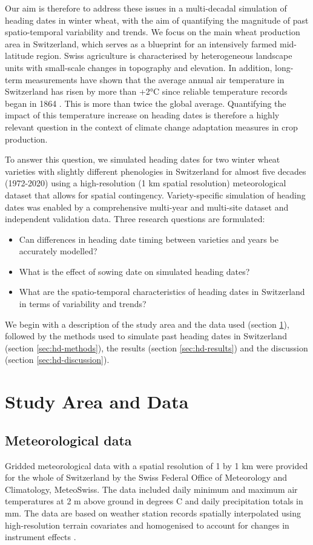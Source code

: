 Our aim is therefore to address these issues in a multi-decadal simulation of heading dates in winter wheat, with the aim of quantifying the magnitude of past spatio-temporal variability and trends. We focus on the main wheat production area in Switzerland, which serves as a blueprint for an intensively farmed mid-latitude region. Swiss agriculture is characterised by heterogeneous landscape units with small-scale changes in topography and elevation. In addition, long-term measurements have shown that the average annual air temperature in Switzerland has risen by more than +2°C since reliable temperature records began in 1864 \citep{isotta_longterm_2019}. This is more than twice the global average. Quantifying the impact of this temperature increase on heading dates is therefore a highly relevant question in the context of climate change adaptation measures in crop production.

To answer this question, we simulated heading dates for two winter wheat varieties with slightly different phenologies in Switzerland for almost five decades (1972-2020) using a high-resolution (1 km spatial resolution) meteorological dataset that allows for spatial contingency. Variety-specific simulation of heading dates was enabled by a comprehensive multi-year and multi-site dataset and independent validation data. Three research questions are formulated:
\begin{itemize}
    \item Can differences in heading date timing between varieties and years be accurately modelled?
    \item What is the effect of sowing date on simulated heading dates?
    \item What are the spatio-temporal characteristics of heading dates in Switzerland in terms of variability and trends?
\end{itemize}
We begin with a description of the study area and the data used (section \ref{sec:hd-data}), followed by the methods used to simulate past heading dates in Switzerland (section \ref{sec:hd-methods}), the results (section \ref{sec:hd-results}) and the discussion (section \ref{sec:hd-discussion}).

\section{Study Area and Data}
\label{sec:hd-data}

\subsection{Meteorological data}
\label{subsec:meteo}
Gridded meteorological data with a spatial resolution of 1 by 1 km were provided for the whole of Switzerland by the Swiss Federal Office of Meteorology and Climatology, MeteoSwiss. The data included daily minimum and maximum air temperatures at 2 m above ground in degrees C and daily precipitation totals in mm. The data are based on weather station records spatially interpolated using high-resolution terrain covariates \citep{frei_interpolation_2014} and homogenised to account for changes in instrument effects \citep{ceppi_revisiting_2012}.

